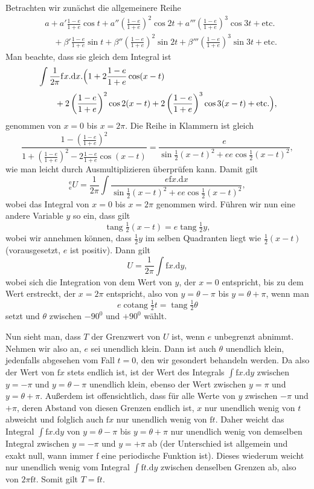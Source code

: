 \par
Betrachten wir zunächst die allgemeinere Reihe
\[
\tag*{(U)}\begin{aligned}
&a+a'\tfrac{1-e}{1+e}\cos t+a''\left(\tfrac{1-e}{1+e}\right)^2\cos2t+a'''\left(\tfrac{1-e}{1+e}\right)^3\cos3t+\text{etc.}\\[3pt]
&\quad{}+\beta'\tfrac{1-e}{1+e}\sin t+\beta''\left(\tfrac{1-e}{1+e}\right)^2\sin2t+\beta'''\left(\tfrac{1-e}{1+e}\right)^3\sin3t+\text{etc.}
\end{aligned}
\]
\noindent Man beachte, dass sie gleich dem Integral ist
\[
\begin{aligned}
&\int\frac{1}{2\pi}\mathrm{f}x.\mathrm{d}x.\Bigl(1+2\frac{1-e}{1+e}\cos(x-t)\\[3pt]
&\qquad{}+2\left(\frac{1-e}{1+e}\right)^2\cos2(x-t)+2\left(\frac{1-e}{1+e}\right)^3\cos3(x-t)+\text{etc.}\Bigr),
\end{aligned}
\]
\noindent genommen von \(x=0\) bis \(x=2\pi\). Die Reihe in Klammern ist gleich
\[
\frac{1-\left(\frac{1-e}{1+e}\right)^2}{1+\left(\frac{1-e}{1+e}\right)^2-2\frac{1-e}{1+e}\cos(x-t)}
=\frac{e}{\sin\tfrac12(x-t)^2+ee\cos\tfrac12(x-t)^2},
\]
\noindent wie man leicht durch Ausmultiplizieren überprüfen kann. Damit gilt
\[
{}^{\mathrm{e}}_{\mathrm{e}}\!U=\frac{1}{2\pi}\int\frac{e\mathrm{f}x.\mathrm{d}x}{\sin\tfrac12(x-t)^2+ee\cos\tfrac12(x-t)^2},
\]
\noindent wobei das Integral von \(x=0\) bis \(x=2\pi\) genommen wird. Führen wir nun eine andere Variable \(y\) so ein, dass gilt
\[
\operatorname{tang}\tfrac12(x-t)=e\operatorname{tang}\tfrac12y,
\]
\noindent wobei wir annehmen können, dass \(\tfrac12y\) im selben Quadranten liegt wie \(\tfrac12(x-t)\) (vorausgesetzt, \(e\) ist positiv). Dann gilt
\[
U=\frac{1}{2\pi}\int\mathrm{f}x.\mathrm{d}y,
\]
\noindent wobei sich die Integration von dem Wert von \(y\), der \(x=0\) entspricht, bis zu dem Wert erstreckt, der \(x=2\pi\) entspricht, also von \(y=\theta-\pi\) bis \(y=\theta+\pi\), wenn man
\[
e\operatorname{cotang}\tfrac12t=\operatorname{tang}\tfrac12\theta
\]
\noindent setzt und \(\theta\) zwischen \(-90^0\) und \(+90^0\) wählt.
\par
Nun sieht man, dass \(T\) der Grenzwert von \(U\) ist, wenn \(e\) unbegrenzt abnimmt. Nehmen wir also an, \(e\) sei unendlich klein. Dann ist auch \(\theta\) unendlich klein, jedenfalls abgesehen vom Fall \(t=0\), den wir gesondert behandeln werden. Da also der Wert von \(\mathrm{f}x\) stets endlich ist, ist der Wert des Integrals \(\int\mathrm{f}x.\mathrm{d}y\) zwischen \(y=-\pi\) und \(y=\theta-\pi\) unendlich klein, ebenso der Wert zwischen \(y=\pi\) und \(y=\theta+\pi\). Außerdem ist offensichtlich, dass für alle Werte von \(y\) zwischen \(-\pi\) und \(+\pi\), deren Abstand von diesen Grenzen endlich ist, \(x\) nur unendlich wenig von \(t\) abweicht und folglich auch \(\mathrm{f}x\) nur unendlich wenig von \(\mathrm{f}t\). Daher weicht das Integral \(\int\mathrm{f}x.\mathrm{d}y\) von \(y=\theta-\pi\) bis \(y=\theta+\pi\) nur unendlich wenig von demselben Integral zwischen \(y=-\pi\) und \(y=+\pi\) ab (der Unterschied ist allgemein und exakt null, wann immer \(\mathrm{f}\) eine periodische Funktion ist). Dieses wiederum weicht nur unendlich wenig vom Integral \(\int\mathrm{f}t.\mathrm{d}y\) zwischen denselben Grenzen ab, also von \(2\pi\mathrm{f}t\). Somit gilt \(T=\mathrm{f}t\).
